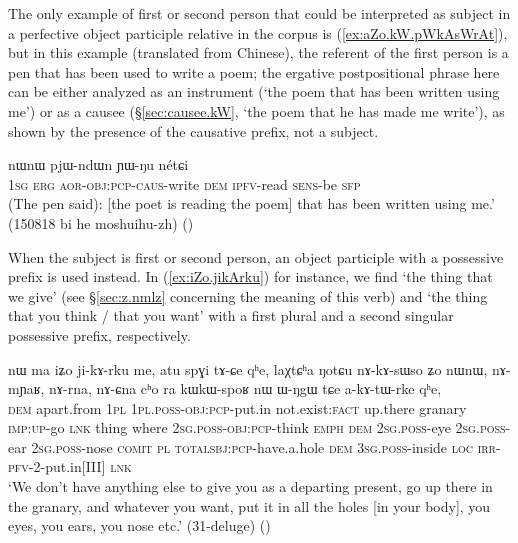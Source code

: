 The only example of first or second person that could be interpreted as subject in a perfective object participle relative in the corpus is (\ref{ex:aZo.kW.pWkAsWrAt}), but in this example (translated from Chinese), the referent of the first person is a pen that has been used to write a poem; the ergative postpositional phrase  here can be either analyzed as an instrument (`the poem that has been written using me') or as a causee  (§\ref{sec:causee.kW}, `the poem that he has made me write'), as shown by the presence of the causative  prefix, not a subject.

\begin{exe}
\ex \label{ex:aZo.kW.pWkAsWrAt}
 nɯnɯ pjɯ-ndɯn ɲɯ-ŋu nétɕi \\
\textsc{1sg} \textsc{erg} \textsc{aor}-\textsc{obj}:\textsc{pcp}-\textsc{caus}-write \textsc{dem} \textsc{ipfv}-read \textsc{sens}-be \textsc{sfp} \\
\glt (The pen said): [the poet is reading the poem] that has been written using me.' (150818 bi he moshuihu-zh)
()
\end{exe}  

When the subject is first or second person, an object participle with a possessive prefix  is used instead. In (\ref{ex:iZo.jikArku}) for instance, we find  `the thing that we give' (see §\ref{sec:z.nmlz} concerning the meaning of this verb) and  `the thing that you think / that you want' with a first plural and a second singular possessive prefix, respectively.

\begin{exe}
\ex \label{ex:iZo.jikArku}
\gll   nɯ ma iʑo ji-kɤ-rku me,  atu spɣi tɤ-ɕe qʰe, laχtɕʰa ŋotɕu nɤ-kɤ-sɯso ʑo nɯnɯ, 
nɤ-mɲaʁ, nɤ-rna, nɤ-ɕna cʰo ra kɯ\redp{}kɯ-spoʁ nɯ ɯ-ŋgɯ tɕe a-kɤ-tɯ-rke qʰe, \\
\textsc{dem} apart.from \textsc{1pl} \textsc{1pl}.\textsc{poss}-\textsc{obj}:\textsc{pcp}-put.in not.exist:\textsc{fact} up.there granary \textsc{imp}:\textsc{up}-go \textsc{lnk} thing where \textsc{2sg}.\textsc{poss}-\textsc{obj}:\textsc{pcp}-think \textsc{emph} \textsc{dem} \textsc{2sg}.\textsc{poss}-eye  \textsc{2sg}.\textsc{poss}-ear  \textsc{2sg}.\textsc{poss}-nose \textsc{comit} \textsc{pl}  \textsc{total}\redp{}\textsc{sbj}:\textsc{pcp}-have.a.hole \textsc{dem} \textsc{3sg}.\textsc{poss}-inside \textsc{loc} \textsc{irr}-\textsc{pfv}-2-put.in[III] \textsc{lnk} \\
\glt `We don't have anything else to give you as a departing present, go up there in the granary, and whatever you want, put it in all the holes [in your body], you eyes, you ears, you nose etc.' (31-deluge) 	()
\end{exe}  

